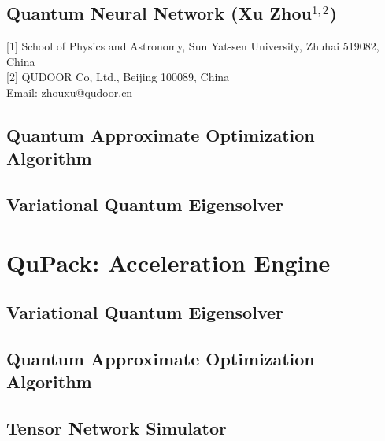 \documentclass[pra,twocolumn,superscriptaddress,floatfix,nofootinbib,amsmath,amssymb]{revtex4-1}
\begin{document}
\subsection{Quantum Neural Network (Xu Zhou$^{1,2}$)}

[1] School of Physics and Astronomy, Sun Yat-sen University, Zhuhai 519082, China\\

[2] QUDOOR Co, Ltd., Beijing 100089, China\\

Email: \url{zhouxu@qudoor.cn}





\subsection{Quantum Approximate Optimization Algorithm}


\subsection{Variational Quantum Eigensolver}


% 


\section{QuPack: Acceleration Engine}


\subsection{Variational Quantum Eigensolver}


\subsection{Quantum Approximate Optimization Algorithm}


\subsection{Tensor Network Simulator}

\end{document}
